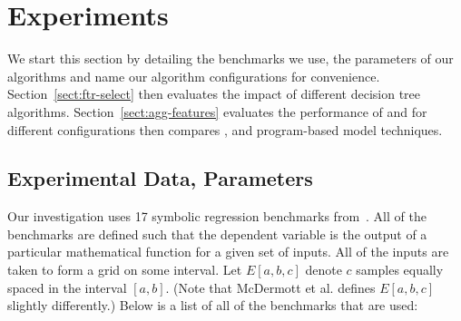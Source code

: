 
\section{Experiments}\label{sect:experiments}

We start this section by detailing the benchmarks we use, the parameters of our algorithms and name our algorithm configurations for convenience. Section~\ref{sect:ftr-select} then evaluates the impact of different decision tree algorithms. Section~\ref{sect:agg-features} evaluates the performance of \FULL and \DRAW for different configurations then compares \FULL, \DRAW and program-based model techniques.
 
\subsection{Experimental Data, Parameters}\label{sect:data_sets}

Our investigation uses 17 symbolic regression benchmarks from~\cite{benchmarks}. All of the benchmarks are defined such that the dependent variable is the output of a particular mathematical function for a given set of inputs.  All of the inputs are taken to form a grid on some interval.  Let $E[a, b, c]$ denote $c$ samples equally spaced in the interval $[a,b]$. (Note that McDermott et al. defines $E[a, b, c]$ slightly differently.)  Below is a list of all of the benchmarks that are used:

